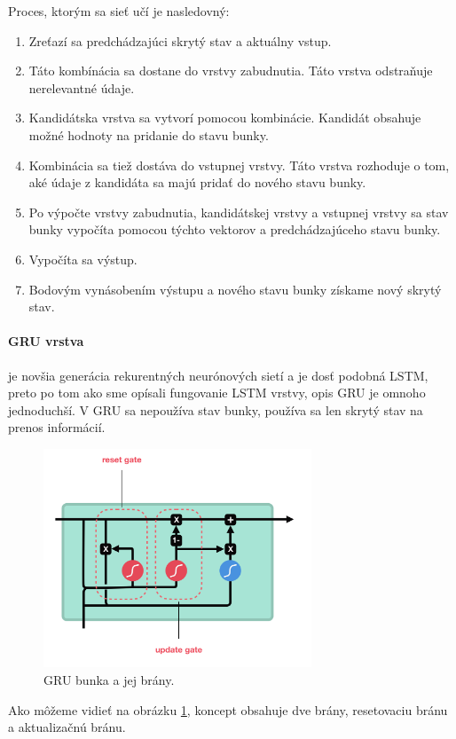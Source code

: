 Proces, ktorým sa sieť učí je nasledovný:
\begin{enumerate}
    \item Zreťazí sa predchádzajúci skrytý stav a aktuálny vstup.
    \item Táto kombínácia sa dostane do vrstvy zabudnutia. Táto vrstva odstraňuje nerelevantné údaje.
    \item Kandidátska vrstva sa vytvorí pomocou kombinácie. Kandidát obsahuje možné hodnoty na pridanie do stavu bunky.
    \item Kombinácia sa tiež dostáva do vstupnej vrstvy. Táto vrstva rozhoduje o tom, aké údaje z kandidáta sa majú pridať do nového stavu bunky.
    \item Po výpočte vrstvy zabudnutia, kandidátskej vrstvy a vstupnej vrstvy sa stav bunky vypočíta pomocou týchto vektorov a predchádzajúceho stavu bunky.
    \item Vypočíta sa výstup.
    \item Bodovým vynásobením výstupu a nového stavu bunky získame nový skrytý stav.
\end{enumerate}

\paragraph{GRU vrstva} je novšia generácia rekurentných neurónových sietí a je dosť podobná LSTM, preto po tom ako sme opísali fungovanie LSTM vrstvy, opis GRU je omnoho jednoduchší. V GRU sa nepoužíva stav bunky, používa sa len skrytý stav na prenos informácií. 

\begin{figure}[!htbp]
  \centering
  \includegraphics[width=8cm]{img/gru.png}
  \caption{GRU bunka a jej brány.}
  \label{gru}
\end{figure}

Ako môžeme vidieť na obrázku \ref{gru}, koncept obsahuje dve brány, resetovaciu bránu a aktualizačnú bránu.

